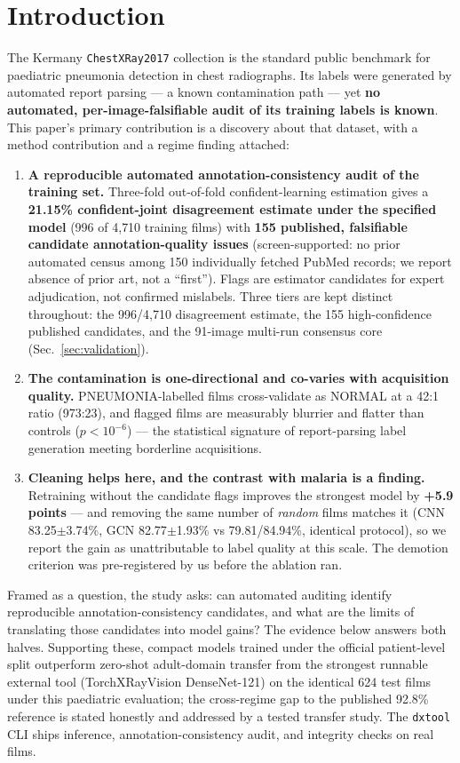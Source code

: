 
\section{Introduction}
The Kermany \texttt{ChestXRay2017} collection is the standard public
benchmark for paediatric pneumonia detection in chest radiographs. Its
labels were generated by automated report parsing --- a known
contamination path --- yet \textbf{no automated, per-image-falsifiable
audit of its training labels is known}. This paper's primary contribution is a discovery about
that dataset, with a method contribution and a regime finding attached:
\begin{enumerate}
\item \textbf{A reproducible automated annotation-consistency audit of the training set.}
Three-fold out-of-fold confident-learning estimation gives a \textbf{21.15\% confident-joint disagreement estimate under the specified model} (996 of 4{,}710 training films) with \textbf{155 published, falsifiable candidate annotation-quality issues} (screen-supported: no prior automated census among 150 individually fetched PubMed records; we report absence of prior art, not a ``first''). Flags are estimator candidates for expert adjudication, not confirmed mislabels. Three tiers are kept distinct throughout: the 996/4{,}710 disagreement estimate, the 155 high-confidence published candidates, and the 91-image multi-run consensus core (Sec.~\ref{sec:validation}).
\item \textbf{The contamination is one-directional and co-varies with
acquisition quality.} PNEUMONIA-labelled films cross-validate as NORMAL
at a 42:1 ratio (973:23), and flagged films are measurably blurrier and
flatter than controls ($p<10^{-6}$) --- the statistical signature of
report-parsing label generation meeting borderline acquisitions.
\item \textbf{Cleaning helps here, and the contrast with malaria is a
finding.} Retraining without the candidate flags improves the strongest model by \textbf{+5.9 points} --- and removing the same number of \emph{random} films matches it (CNN 83.25$\pm$3.74\%, GCN 82.77$\pm$1.93\% vs 79.81/84.94\%, identical protocol), so we report the gain as unattributable to label quality at this scale. The demotion criterion was pre-registered by us before the ablation ran.
\end{enumerate}
Framed as a question, the study asks: can automated auditing identify reproducible annotation-consistency candidates, and what are the limits of translating those candidates into model gains? The evidence below answers both halves. Supporting these, compact models trained under the official patient-level
split outperform zero-shot adult-domain transfer from the strongest runnable external tool (TorchXRayVision
DenseNet-121) on the identical 624 test films under this paediatric evaluation; the
cross-regime gap to the published 92.8\% reference is stated honestly
and addressed by a tested transfer study. The \texttt{dxtool} CLI ships
inference, annotation-consistency audit, and integrity checks on real films.

